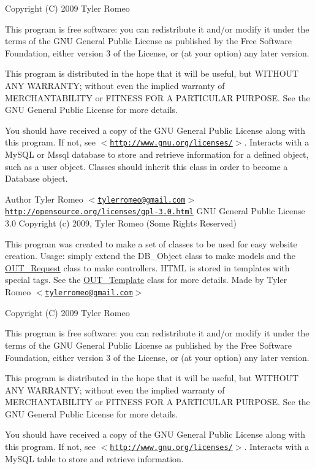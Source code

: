 Copyright (C) 2009 Tyler Romeo

This program is free software: you can redistribute it and/or modify it under the terms of the GNU General Public License as published by the Free Software Foundation, either version 3 of the License, or (at your option) any later version.

This program is distributed in the hope that it will be useful, but WITHOUT ANY WARRANTY; without even the implied warranty of MERCHANTABILITY or FITNESS FOR A PARTICULAR PURPOSE. See the GNU General Public License for more details.

You should have received a copy of the GNU General Public License along with this program. If not, see $<$\href{http://www.gnu.org/licenses/}{\tt http://www.gnu.org/licenses/}$>$. Interacts with a MySQL or Mssql database to store and retrieve information for a defined object, such as a user object. Classes should inherit this class in order to become a Database object.

\begin{DoxyAuthor}{Author}
Tyler Romeo $<$\href{mailto:tylerromeo@gmail.com}{\tt tylerromeo@gmail.com}$>$  \href{http://opensource.org/licenses/gpl-3.0.html}{\tt http://opensource.org/licenses/gpl-\/3.0.html} GNU General Public License 3.0  Copyright (c) 2009, Tyler Romeo (Some Rights Reserved)
\end{DoxyAuthor}
This program was created to make a set of classes to be used for easy website creation. Usage: simply extend the DB\_\-Object class to make models and the \hyperlink{classOUT__Request}{OUT\_\-Request} class to make controllers. HTML is stored in templates with special tags. See the \hyperlink{classOUT__Template}{OUT\_\-Template} class for more details. Made by Tyler Romeo $<$\href{mailto:tylerromeo@gmail.com}{\tt tylerromeo@gmail.com}$>$

Copyright (C) 2009 Tyler Romeo

This program is free software: you can redistribute it and/or modify it under the terms of the GNU General Public License as published by the Free Software Foundation, either version 3 of the License, or (at your option) any later version.

This program is distributed in the hope that it will be useful, but WITHOUT ANY WARRANTY; without even the implied warranty of MERCHANTABILITY or FITNESS FOR A PARTICULAR PURPOSE. See the GNU General Public License for more details.

You should have received a copy of the GNU General Public License along with this program. If not, see $<$\href{http://www.gnu.org/licenses/}{\tt http://www.gnu.org/licenses/}$>$. Interacts with a MySQL table to store and retrieve information.

